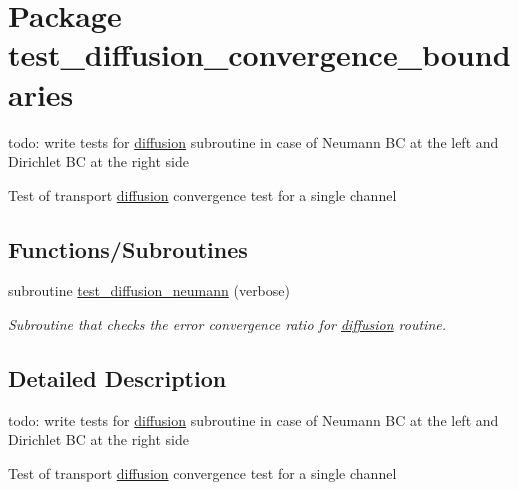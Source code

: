 \hypertarget{a00079}{
\section{Package test\_\-diffusion\_\-convergence\_\-boundaries}
\label{a00079}
}
todo: write tests for \hyperlink{a00056}{diffusion} subroutine in case of Neumann BC at the left and Dirichlet BC at the right side

Test of transport \hyperlink{a00056}{diffusion} convergence test for a single channel  


\subsection*{Functions/Subroutines}
\begin{CompactItemize}
\item 
\hypertarget{a00079_f3d5d7cbf2bb6f8eabd64a842adacbfd}{
subroutine \hyperlink{a00079_f3d5d7cbf2bb6f8eabd64a842adacbfd}{test\_\-diffusion\_\-neumann} (verbose)}
\label{a00079_f3d5d7cbf2bb6f8eabd64a842adacbfd}

\begin{CompactList}\small\item\em Subroutine that checks the error convergence ratio for \hyperlink{a00056}{diffusion} routine. \item\end{CompactList}\end{CompactItemize}


\subsection{Detailed Description}
todo: write tests for \hyperlink{a00056}{diffusion} subroutine in case of Neumann BC at the left and Dirichlet BC at the right side

Test of transport \hyperlink{a00056}{diffusion} convergence test for a single channel 

